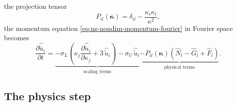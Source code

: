 \documentclass{article}
\begin{document}
the projection tensor
\begin{equation}\label{eq:ns-projection-tensor}
  P_{il}(\boldsymbol{\kappa}) = \delta_{il} - \frac{\kappa_i \kappa_l}{\kappa^2},
\end{equation}
the momentum equation \eqref{eq:ns-nondim-momentum-fourier} in Fourier space
becomes
\begin{equation}\label{eq:ns-fourier-final}
  \frac{\partial \hat{\tilde u}_i}{\partial t}
  = \underbrace{-\sigma_L \left( \kappa_j \frac{\partial \hat{\tilde u}_i}{\partial \kappa_j} + 3\, \hat{\tilde u}_i \right)
  - \sigma_U\, \hat{\tilde u}_i}_{\text{scaling terms}}
  \underbrace{- P_{il}(\boldsymbol{\kappa}) \left( \hat{N}_l - \hat{G}_l + \hat{F}_l \right)}_{\text{physical terms}}.
\end{equation}

\subsection{The physics step}\label{ssec:ns-physics-step}
\end{document}
